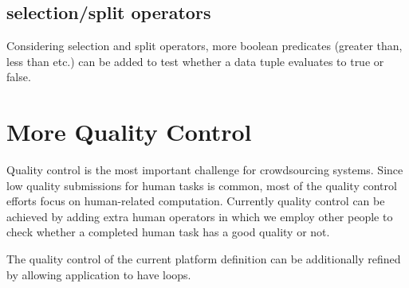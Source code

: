 \subsection{selection/split operators}
Considering selection and split operators, more boolean predicates (greater than, less than etc.) can be added to test whether a data tuple evaluates to true or false.

\section{More Quality Control}
Quality control is the most important challenge for crowdsourcing systems. Since low quality submissions for human tasks is common, most of the quality control efforts focus on human-related computation. Currently quality control can be achieved by adding extra human operators in which we employ other people to check whether a completed human task has a good quality or not.

The quality control of the current platform definition can be additionally refined by allowing application to have loops.   


